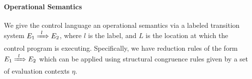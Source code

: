 \paragraph{Operational Semantics}
\label{sec:control-lang-semantics}
We give the control language an operational semantics via a labeled transition system $E_1 \ctrlstep[l] E_2$, where $l$ is the label, and $L$ is the location at which the control program is executing.
Specifically, we have reduction rules of the form $E_1 \ctrlstep[l] E_2$ which can be applied using structural congruence rules given by a set of evaluation contexts $\eta$.

\begin{syntax}
  \alternative{\iota}      

     \\
   \\
   \\
   \\
\end{syntax}

